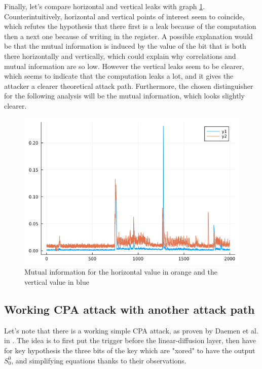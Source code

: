\documentclass[a4paper,11pt,twocolumn]{article}
\begin{document}
	Finally, let's compare horizontal and vertical leaks with graph \ref{hvval}. Counterintuitively, horizontal and vertical points of interest seem to coincide, which refutes the hypothesis that there first is a leak because of the computation then a next one because of writing in the register. A possible explanation would be that the mutual information is induced by the value of the bit that is both there horizontally and vertically, which could explain why correlations and mutual information are so low. However the vertical leaks seem to be clearer, which seems to indicate that the computation leaks a lot, and it gives the attacker a clearer theoretical attack path. Furthermore, the chosen distinguisher for the following analysis will be the mutual information, which looks slightly clearer.
	
	\begin{figure}[h]
		\centering
		\includegraphics[scale=0.3]{h_and_v_one_byte}
		\caption{Mutual information for the horizontal value in orange and the vertical value in blue}
		\label{hvval}
	\end{figure}
	
	\subsection{Working CPA attack with another attack path}
	Let's note that there is a working simple CPA attack, as proven by Daemen et al. in \cite{cpa_lin}. The idea is to first put the trigger before the linear-diffusion layer, then have for key hypothesis the three bits of the key which are "xored" to have the output $S_0^0$, and simplifying equations thanks to their observations.
	
\end{document}
